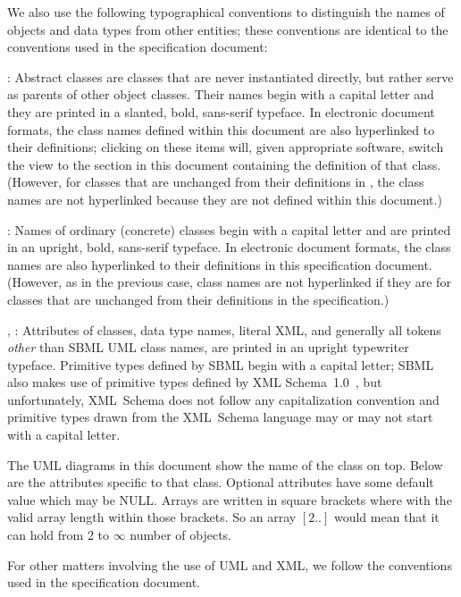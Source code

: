 We also use the following typographical conventions to distinguish the
names of objects and data types from other entities; these conventions
are identical to the conventions used in the \sbmlthreecore specification
document:

\begin{description}

\item {}: Abstract classes are classes that
  are never instantiated directly, but rather serve as parents of other
  object classes.  Their names begin with a capital letter and they are
  printed in a slanted, bold, sans-serif typeface.  In electronic
  document formats, the class names defined within this document are
  also hyperlinked to their definitions; clicking
  on these items will, given appropriate software, switch the view to
  the section in this document containing the definition of that class.
  (However, for classes that are unchanged from their definitions in
  \sbmlthreecore, the class names are not hyperlinked because they
  are not defined within this document.)

\item {}: Names of ordinary (concrete) classes begin with a
  capital letter and are printed in an upright, bold, sans-serif
  typeface.  In electronic document formats, the class names are also
  hyperlinked to their definitions in this specification document.
  (However, as in the previous case, class names are not hyperlinked if
  they are for classes that are unchanged from their definitions in the
  \sbmlthreecore specification.)

\item {}, : Attributes of classes, data
  type names, literal XML, and generally all tokens \emph{other} than
  SBML UML class names, are printed in an upright typewriter typeface.
  Primitive types defined by SBML begin with a capital letter; SBML also
  makes use of primitive types defined by XML
  Schema~1.0~\citep{biron:2000,fallside:2000,thompson:2000}, but
  unfortunately, XML~Schema does not follow any capitalization
  convention and primitive types drawn from the XML~Schema language may
  or may not start with a capital letter.

\end{description}

The UML diagrams in this document show the name of the class on top. 
Below are the attributes specific to that class. Optional attributes 
have some default value which may be NULL. Arrays are written in square 
brackets where with the valid array length within those brackets. So an 
array $[2..]$ would mean that it can hold from 2 to $\infty$ number of 
objects. 

For other matters involving the use of UML and XML, we follow the 
conventions used in the \sbmlthreecore specification document. 



